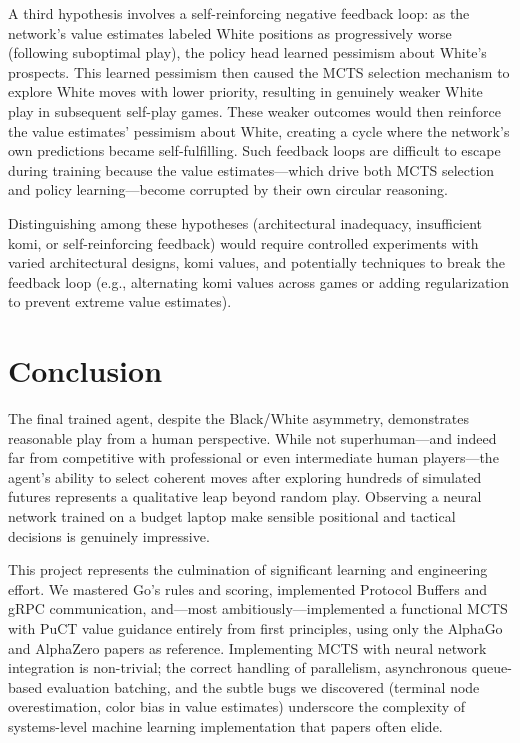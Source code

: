 \documentclass[12pt]{article}
\begin{document}
A third hypothesis involves a self-reinforcing negative feedback loop: as the network's value estimates labeled White positions as progressively worse (following suboptimal play), the policy head learned pessimism about White's prospects. This learned pessimism then caused the MCTS selection mechanism to explore White moves with lower priority, resulting in genuinely weaker White play in subsequent self-play games. These weaker outcomes would then reinforce the value estimates' pessimism about White, creating a cycle where the network's own predictions became self-fulfilling. Such feedback loops are difficult to escape during training because the value estimates—which drive both MCTS selection and policy learning—become corrupted by their own circular reasoning.

Distinguishing among these hypotheses (architectural inadequacy, insufficient komi, or self-reinforcing feedback) would require controlled experiments with varied architectural designs, komi values, and potentially techniques to break the feedback loop (e.g., alternating komi values across games or adding regularization to prevent extreme value estimates).

\section{Conclusion}

The final trained agent, despite the Black/White asymmetry, demonstrates reasonable play from a human perspective. While not superhuman—and indeed far from competitive with professional or even intermediate human players—the agent's ability to select coherent moves after exploring hundreds of simulated futures represents a qualitative leap beyond random play. Observing a neural network trained on a budget laptop make sensible positional and tactical decisions is genuinely impressive.

This project represents the culmination of significant learning and engineering effort. We mastered Go's rules and scoring, implemented Protocol Buffers and gRPC communication, and—most ambitiously—implemented a functional MCTS with PuCT value guidance entirely from first principles, using only the AlphaGo and AlphaZero papers as reference. Implementing MCTS with neural network integration is non-trivial; the correct handling of parallelism, asynchronous queue-based evaluation batching, and the subtle bugs we discovered (terminal node overestimation, color bias in value estimates) underscore the complexity of systems-level machine learning implementation that papers often elide.
\end{document}
